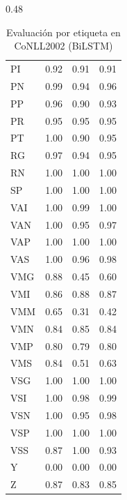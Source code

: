 \begin{table}[H]
\begin{subtable}{0.48\textwidth}
\begin{tabular}{lccc}
PI  & 0.92 & 0.91 & 0.91 \\
PN  & 0.99 & 0.94 & 0.96 \\
PP  & 0.96 & 0.90 & 0.93 \\
PR  & 0.95 & 0.95 & 0.95 \\
PT  & 1.00 & 0.90 & 0.95 \\
RG  & 0.97 & 0.94 & 0.95 \\
RN  & 1.00 & 1.00 & 1.00 \\
SP  & 1.00 & 1.00 & 1.00 \\
VAI & 1.00 & 0.99 & 1.00 \\
VAN & 1.00 & 0.95 & 0.97 \\
VAP & 1.00 & 1.00 & 1.00 \\
VAS & 1.00 & 0.96 & 0.98 \\
VMG & 0.88 & 0.45 & 0.60 \\
VMI & 0.86 & 0.88 & 0.87 \\
VMM & 0.65 & 0.31 & 0.42 \\
VMN & 0.84 & 0.85 & 0.84 \\
VMP & 0.80 & 0.79 & 0.80 \\
VMS & 0.84 & 0.51 & 0.63 \\
VSG & 1.00 & 1.00 & 1.00 \\
VSI & 1.00 & 0.98 & 0.99 \\
VSN & 1.00 & 0.95 & 0.98 \\
VSP & 1.00 & 1.00 & 1.00 \\
VSS & 0.87 & 1.00 & 0.93 \\
Y   & 0.00 & 0.00 & 0.00 \\
Z   & 0.87 & 0.83 & 0.85 \\
\hline
\end{tabular}
\caption{Part 2}
\end{subtable}

\caption{Evaluación por etiqueta en CoNLL2002 (BiLSTM)}
\end{table}